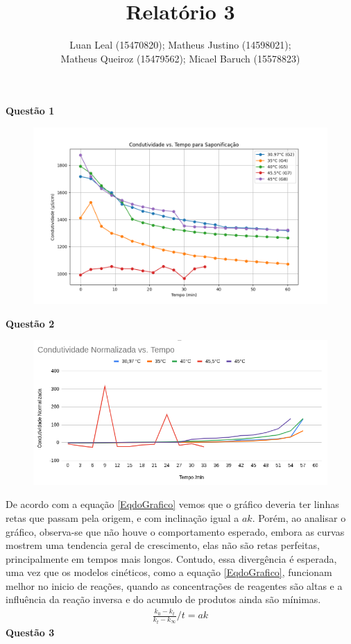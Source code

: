 \documentclass{article}
\author{Luan Leal (15470820); Matheus Justino (14598021); 
\\Matheus Queiroz (15479562); Micael Baruch (15578823)}
\title{Relatório 3}
\begin{document}
\maketitle

\textbf{Questão 1}

\begin{figure}[H]
    \centering
    \includegraphics[width=.5\linewidth]{figs/graph1.png}
    \label{grafico1}
\end{figure}

\textbf{Questão 2}

\begin{figure}[H]
    \centering
    \includegraphics[width=.5\linewidth]{figs/graph2.png}
    \label{grafico2}
\end{figure}

De acordo com a equação \cref{EqdoGrafico} vemos que o gráfico deveria ter linhas retas que passam pela origem, e com inclinação igual a \(ak\). Porém, ao analisar o gráfico, observa-se que não houve o comportamento esperado, embora as curvas mostrem uma tendencia geral de crescimento, elas não são retas perfeitas, principalmente em tempos mais longos. Contudo, essa divergência é esperada, uma vez que os modelos cinéticos, como a equação \cref{EqdoGrafico}, funcionam melhor no inicio de reações, quando as concentrações de reagentes são altas e a influência da reação inversa e do acumulo de produtos ainda são mínimas. 
\begin{align}
	\frac{k_0 - k_t}{k_t - k_\infty} / t = ak
	\label{EqdoGrafico}
\end{align}
\textbf{Questão 3}
\end{document}
